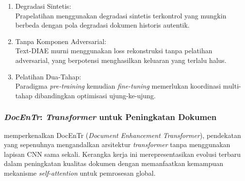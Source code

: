\begin{enumerate}[leftmargin=*, labelsep=0.5em, itemindent=0pt, label=\arabic*., topsep=0pt, partopsep=0pt]
\begin{enumerate}[leftmargin=1.5em, labelsep=0.5em, itemindent=0pt, label=\alph*., topsep=0pt, parsep=0pt, itemsep=0pt]
      \item Degradasi Sintetis: \mbox{}\\[0.1em]
            Prapelatihan menggunakan degradasi sintetis terkontrol yang mungkin berbeda dengan pola degradasi dokumen historis autentik.

      \item Tanpa Komponen Adversarial: \mbox{}\\[0.1em]
            Text-DIAE murni menggunakan loss rekonstruksi tanpa pelatihan adversarial, yang berpotensi menghasilkan keluaran yang terlalu halus.

      \item Pelatihan Dua-Tahap: \mbox{}\\[0.1em]
            Paradigma \textit{pre-training} kemudian \textit{fine-tuning} memerlukan koordinasi multi-tahap dibandingkan optimisasi ujung-ke-ujung.
\end{enumerate}

\end{enumerate}

\subsubsection{\textit{DocEnTr}: \textit{Transformer} untuk Peningkatan Dokumen}
\label{subsubsec:docentr}

\textcite{souibgui2022docentr} memperkenalkan DocEnTr (\textit{Document Enhancement Transformer}), pendekatan yang sepenuhnya mengandalkan arsitektur \textit{transformer} tanpa menggunakan lapisan CNN sama sekali. Kerangka kerja ini merepresentasikan evolusi terbaru dalam peningkatan kualitas dokumen dengan memanfaatkan kemampuan mekanisme \textit{self-attention} untuk pemrosesan global.


